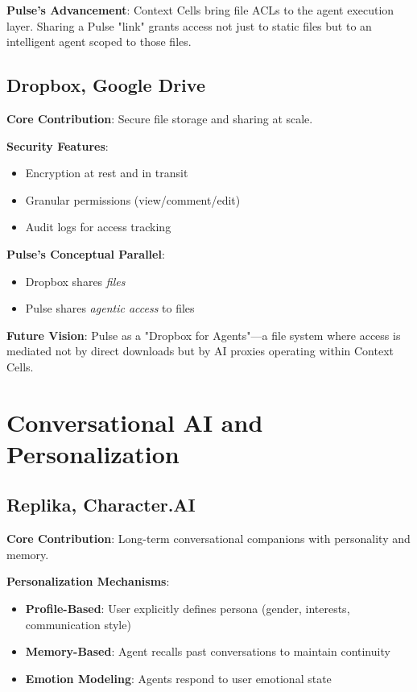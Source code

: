 \textbf{Pulse's Advancement}: Context Cells bring file ACLs to the agent execution layer. Sharing a Pulse "link" grants access not just to static files but to an intelligent agent scoped to those files.

\subsection{Dropbox, Google Drive}

\textbf{Core Contribution}: Secure file storage and sharing at scale.

\textbf{Security Features}:
\begin{itemize}
    \item Encryption at rest and in transit
    \item Granular permissions (view/comment/edit)
    \item Audit logs for access tracking
\end{itemize}

\textbf{Pulse's Conceptual Parallel}:
\begin{itemize}
    \item Dropbox shares \textit{files}
    \item Pulse shares \textit{agentic access} to files
\end{itemize}

\textbf{Future Vision}: Pulse as a "Dropbox for Agents"—a file system where access is mediated not by direct downloads but by AI proxies operating within Context Cells.

\section{Conversational AI and Personalization}

\subsection{Replika, Character.AI}

\textbf{Core Contribution}: Long-term conversational companions with personality and memory.

\textbf{Personalization Mechanisms}:
\begin{itemize}
    \item \textbf{Profile-Based}: User explicitly defines persona (gender, interests, communication style)
    \item \textbf{Memory-Based}: Agent recalls past conversations to maintain continuity
    \item \textbf{Emotion Modeling}: Agents respond to user emotional state
\end{itemize}


